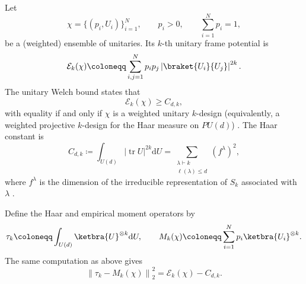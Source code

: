 \documentclass[aps,twocolumn,pra,superscriptaddress,nofootinbib]{revtex4-2}
\begin{document}
Let
\begin{equation}
    \chi=\{(p_i,U_i)\}_{i=1}^{N},
    \qquad
    p_i>0,
    \qquad
    \sum_{i=1}^{N}p_i=1,
\end{equation}
be a (weighted) ensemble of unitaries. Its $k$-th unitary frame potential is
\begin{equation}
    \mathcal{E}_{k}(\chi)
    \coloneqq
    \sum_{i,j=1}^{N}
    p_i p_j
    \left|
        \braket{U_i}{U_{j}}
    \right|^{2k}.
\end{equation}
The unitary Welch bound states that
\begin{equation}
    \mathcal{E}_{k}(\chi)\geq C_{d,k},
\end{equation}
with equality if and only if $\chi$ is a {weighted unitary $k$-design (equivalently, a weighted projective $k$-design for the Haar measure on
$PU(d)$)} \cite{GrossAudenaertEisert2007,RoyScott2009}. The Haar constant
is
\begin{equation}
    C_{d,k}
    \coloneqq
    \int_{U(d)}
    \left|\operatorname{tr}U\right|^{2k}\mathrm{d}U
    =
    \sum_{\substack{\lambda\vdash k\\ \ell(\lambda)\leq d}}
    \left(f^{\lambda}\right)^{2},
\end{equation}
where $f^{\lambda}$ is the dimension of the irreducible representation
of $S_k$ associated with $\lambda$
\cite{DiaconisShahshahani1994,Rains1998}.

Define the Haar and empirical moment operators by
\begin{equation}
    \tau_k
    \coloneqq
    \int_{U(d)}\ketbra{U}^{\otimes k}\mathrm{d}U,
    \qquad
    M_k(\chi)
    \coloneqq
    \sum_{i=1}^{N}p_i\ketbra{U_i}^{\otimes k}.
\end{equation}
The same computation as above gives
\begin{equation}
    \left\|
        \tau_k-M_k(\chi)
    \right\|_{2}^{2}
    =
    \mathcal{E}_{k}(\chi)-C_{d,k}.
\end{equation}
\end{document}
